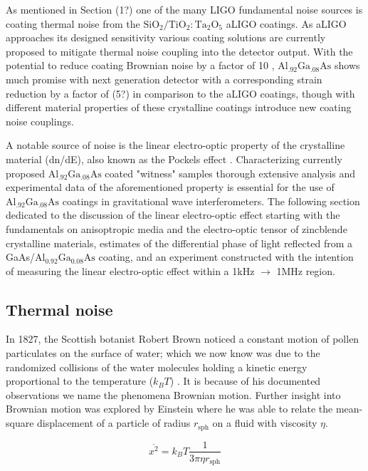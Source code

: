 
 As mentioned in Section (1?) one of the many LIGO fundamental noise sources is coating thermal noise from the $\mathrm{SiO_2}/\mathrm{TiO_2:Ta_2O_5}$ aLIGO coatings. As aLIGO approaches its designed sensitivity various coating solutions are currently proposed to mitigate thermal noise coupling into the detector output.
With the potential to reduce coating Brownian noise by a factor of 10 \cite{Cole:2013}, $\mathrm{Al_{.92}Ga_{.08}As}$ shows much promise with next generation detector with a corresponding strain reduction by a factor of (5?) in comparison to the aLIGO coatings, though with different material properties of these crystalline coatings introduce new coating noise couplings.

A notable source of noise is the linear electro-optic property of the crystalline material (dn/dE), also known as the Pockels effect \cite{abernathy_poster}. Characterizing currently proposed $\mathrm{Al_{.92}Ga_{.08}As}$ coated "witness" samples thorough extensive analysis and experimental data of the aforementioned property is essential for the use of $\mathrm{Al_{.92}Ga_{.08}As}$ coatings in gravitational wave interferometers. The following section dedicated to the discussion of the linear electro-optic effect starting with the fundamentals on anisoptropic media and the electro-optic tensor of zincblende crystalline materials, estimates of the differential phase of light reflected from a GaAs/$\mathrm{Al}_{0.92}\mathrm{Ga}_{0.08}\mathrm{As}$ coating, and an experiment constructed with the intention of measuring the linear electro-optic effect within a 1kHz $\rightarrow$ 1MHz region.

\subsection{Thermal noise}
 In 1827, the Scottish botanist Robert Brown noticed a constant motion of pollen particulates on the surface of water; which we now know was due to the randomized collisions of the water molecules holding a kinetic energy proportional to the temperature ($k_BT$) \cite{Brown:1828}. It is because of his documented observations we name the phenomena Brownian motion. Further insight into Brownian motion was explored by Einstein where he was able to relate the mean-square displacement of a particle of radius $r_\mathrm{sph}$ on a fluid with viscosity $\eta$.

 \begin{equation}
 \overline{x^2} = k_B T  \frac{1}{3 \pi \eta  r_\mathrm{sph}}
 \end{equation}


